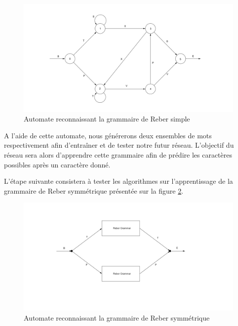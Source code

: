 \documentclass{report}
\theoremstyle{plain}
\theoremstyle{definition}
\theoremstyle{remark}
\begin{document}
\begin{figure}[h!]
\begin{center}
\includegraphics[scale=0.3]{images/reber_simple.png}
\caption{Automate reconnaissant la grammaire de Reber simple}
\label{Grammaire de Reber simple}
\end{center}
\end{figure}

A l'aide de cette automate, nous générerons deux ensembles de mots respectivement afin d'entraîner et de tester notre futur réseau. L'objectif du réseau sera alors d'apprendre cette grammaire afin de prédire les caractères possibles après un caractère donné.

L'étape suivante consistera à tester les algorithmes sur l'apprentissage de la grammaire de Reber symmétrique présentée sur la figure \ref{Grammaire de Reber symmétrique}.  
\begin{figure}[h!]
\begin{center}
\includegraphics[scale=0.5]{images/reber_symmetrique.png}
\caption{Automate reconnaissant la grammaire de Reber symmétrique}
\label{Grammaire de Reber symmétrique}
\end{center}
\end{figure}
\end{document}
